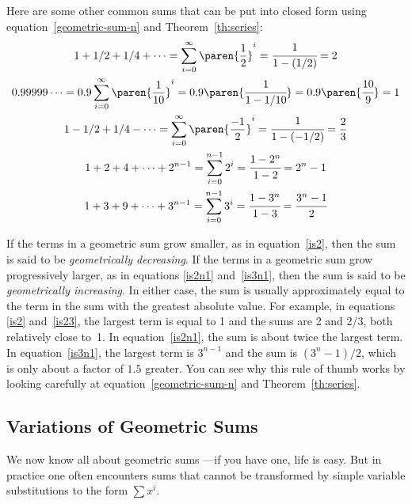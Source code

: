 Here are some other common sums that can be put into closed form using
equation~\ref{geometric-sum-n} and Theorem~\ref{th:series}:
\begingroup {}
\begin{gather}
1 + 1/2 + 1/4 + \cdots = \sum_{i=0}^\infty \paren{\frac{1}{2}}^i %
= \cfrac{1}{1-(1/2)} = 2 \label{is2} \\ 0.99999\dots = 0.9
\sum_{i=0}^{\infty} \paren{\frac{1}{10}}^i = 0.9
\paren{\cfrac{1}{1-1/10}} = 0.9 \paren{\cfrac{10}{9}} = 1 \label{is1}
\\ 1 - 1/2 + 1/4 - \cdots = \sum_{i=0}^\infty \paren{\frac{-1}{2}}^i =
\cfrac{1}{1-(-1/2)} = \frac{2}{3} \label{is23} \\ 1 + 2 + 4 + \cdots +
2^{n-1} = \sum_{i=0}^{n-1} 2^i = \cfrac{1 - 2^n}{1 - 2} = 2^n -
1 \label{is2n1} \\ 1 + 3 + 9 + \cdots + 3^{n-1} = \sum_{i=0}^{n-1} 3^i
= \cfrac{1 - 3^n}{1 - 3} = \cfrac{3^n - 1}{2} \label{is3n1}
\end{gather}
\endgroup

If the terms in a geometric sum grow smaller, as in
equation~\ref{is2}, then the sum is said to be \emph{geometrically
  decreasing}.  If the terms in a geometric sum grow progressively
larger, as in equations \ref{is2n1} and~\ref{is3n1}, then the sum is
said to be \emph{geometrically increasing}.  In either case, the sum
is usually approximately equal to the term in the sum with the
greatest absolute value.  For example, in equations \ref{is2}
and~\ref{is23}, the largest term is equal to 1 and the sums are 2 and
2/3, both relatively close to~1.  In equation~\ref{is2n1}, the sum is
about twice the largest term.  In equation~\ref{is3n1}, the largest
term is $3^{n-1}$ and the sum is $(3^n-1)/2$, which is only about a
factor of $1.5$ greater.  You can see why this rule of thumb works by
looking carefully at equation~\ref{geometric-sum-n} and
Theorem~\ref{th:series}.

\subsection{Variations of Geometric Sums}\label{variant_sum_sec}

We now know all about geometric sums ---if you have one, life is easy.
But in practice one often encounters sums that cannot be transformed
by simple variable substitutions to the form $\sum x^i$.

